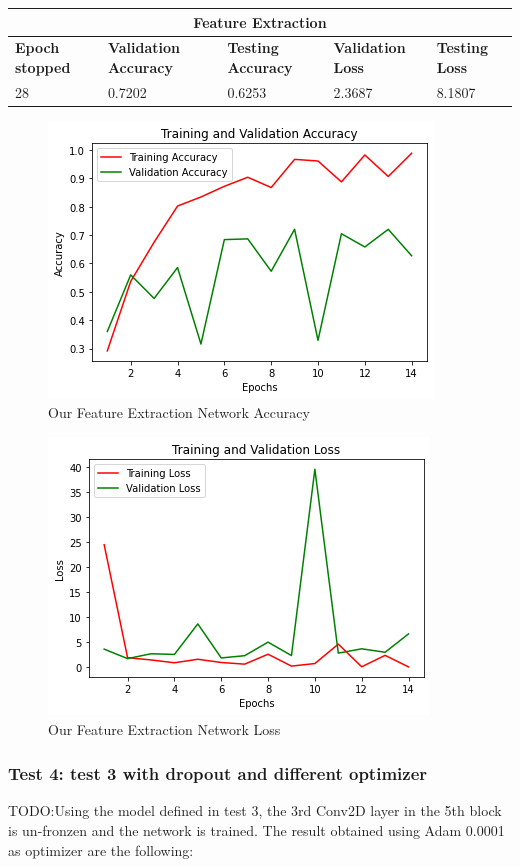 \begin{tabular}{ |p{2cm}|p{2cm}|p{2cm}|p{2cm}|p{2cm}|  }
\hline
\multicolumn{5}{|c|}{Feature Extraction} \\
\hline
\textbf{Epoch stopped} & \textbf{Validation Accuracy} & \textbf{Testing Accuracy} & \textbf{Validation Loss} & \textbf{Testing Loss} \\
\hline
28 & 0.7202 & 0.6253 & 2.3687 & 8.1807\\
\hline
\end{tabular}

\medskip

\begin{figure}[H]
	\centering
	\includegraphics[height=0.45\textwidth]{img/vgg16/vgg16ft1acc.png}
	\caption{Our Feature Extraction Network Accuracy}
	\label{fig:vgg16ft1acc}
\end{figure}

\begin{figure}[H]
	\centering
	\includegraphics[height=0.45\textwidth]{img/vgg16/vgg16ft1loss.png}
	\caption{Our Feature Extraction Network Loss}
	\label{fig:vgg16ft1loss}
\end{figure}










\subsubsection{Test 4: test 3 with dropout and different optimizer}
TODO:Using the model defined in test 3, the 3rd Conv2D layer in the 5th block is un-fronzen and the network is trained. The result obtained using Adam 0.0001 as optimizer are the following:

